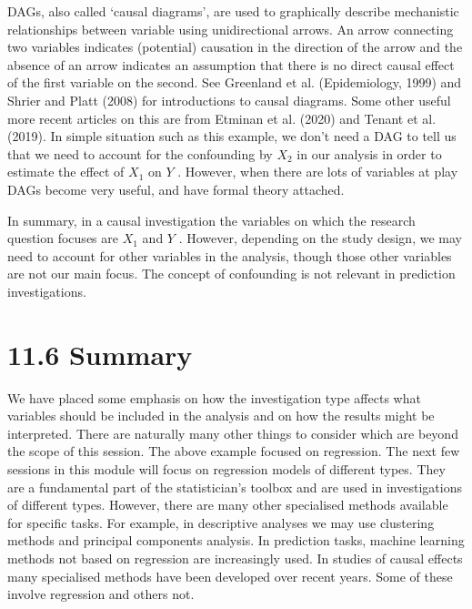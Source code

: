 \documentclass[letterpaper,10pt,english]{jupyterBook}
\let\sphinxpxdimen\pdfpxdimen\else\newdimen\sphinxpxdimen
\begin{document}
\begin{figure}[htbp]
\centering

\noindent\sphinxincludegraphics[height=250\sphinxpxdimen]{{Session_11_Figure_2}.jpg}
\end{figure}

\sphinxAtStartPar
DAGs, also called ‘causal diagrams’, are used to graphically describe mechanistic relationships between variable using uni\sphinxhyphen{}directional arrows. An arrow connecting two variables indicates (potential) causation in the direction of the arrow and the absence of an arrow indicates an assumption that there is no direct causal effect of the first variable on the second. See Greenland et al. (Epidemiology, 1999) and Shrier and Platt (2008) for introductions to causal diagrams. Some other useful more recent articles on this are from Etminan et al. (2020) and Tenant et al. (2019). In simple situation such as this example, we don’t need a DAG to tell us that we need to account for the confounding by \(X_{2}\) in our analysis in order to estimate the effect of \(X_{1}\) on \(Y\) . However, when there are lots of variables at play DAGs become very useful, and have formal theory attached.

\sphinxAtStartPar
In summary, in a causal investigation the variables on which the research question focuses are \(X_{1}\) and \(Y\) . However, depending on the study design, we may need to account for other variables in the analysis, though those other variables are not our main focus. The concept of confounding is not relevant in prediction investigations.


\section{11.6 Summary}
\label{\detokenize{11.g. Types of Investigation:summary}}\label{\detokenize{11.g. Types of Investigation::doc}}
\sphinxAtStartPar
We have placed some emphasis on how the investigation type affects what variables should be included in the analysis and on how the results might be interpreted. There are naturally many other things to consider which are beyond the scope of this session. The above example focused on regression. The next few sessions in this module will focus on regression models of different types. They are a fundamental part of the statistician’s toolbox and are used in investigations of different types. However, there are many other specialised methods available for specific tasks. For example, in descriptive analyses we may use clustering methods and principal components analysis. In prediction tasks, machine learning methods not based on regression are increasingly used. In studies of causal effects many specialised methods have been developed over recent years. Some of these involve regression and others not.
\end{document}
